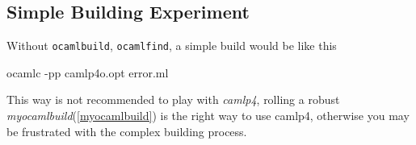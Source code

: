 \subsection{Simple Building Experiment}

Without \verb|ocamlbuild|, \verb|ocamlfind|, a simple build would be
like this

\begin{bashcode}
ocamlc -pp camlp4o.opt error.ml
\end{bashcode}  

This way is not recommended to play with \textit{camlp4}, rolling a
robust \textit{myocamlbuild}(\ref{myocamlbuild}) is the right way to
use camlp4, otherwise you may be frustrated with the complex building
process.

